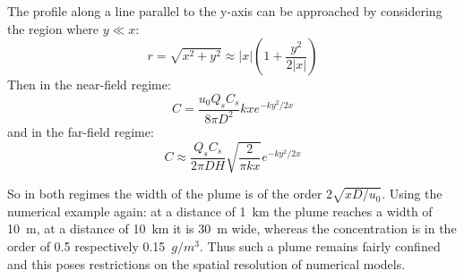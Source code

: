 \documentclass[onecolumn]{article}
\begin{document}
The profile along a line parallel to the y-axis can be approached by considering the region where \(y \ll x\):
\begin{equation}
r = \sqrt{x^2 + y^2} \approx |x| (1 + \frac{y^2}{2|x|})
\end{equation}
Then in the near-field regime:
\begin{equation}
C = \frac{u_0 Q_s C_s}{8 \pi D^2} kx e^{-ky^2/2x}
\end{equation}
\noindent and in the far-field regime:
\begin{equation}
C \approx \frac{Q_s C_s}{2 \pi D H} \sqrt{ \frac{2}{\pi k x}} e^{-ky^2/2x}
\end{equation}

So in both regimes the width of the plume is of the order \(2\sqrt{xD/u_0}\). Using the numerical example
again: at a distance of 1~km the plume reaches a width of 10~m, at a distance of 10~km it is 30~m wide,
whereas the concentration is in the order of 0.5 respectively 0.15~\(g/m^3\). Thus such a
plume remains fairly confined and this poses restrictions on the spatial resolution of numerical models.
\end{document}
